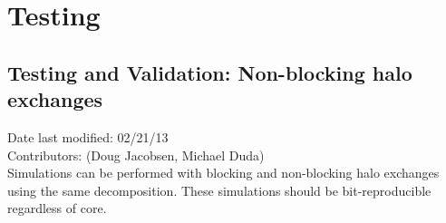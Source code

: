 \documentclass[11pt]{report}
\begin{document}

\chapter{Testing}

\section{Testing and Validation: Non-blocking halo exchanges}
Date last modified: 02/21/13 \\
Contributors: (Doug Jacobsen, Michael Duda) \\

Simulations can be performed with blocking and non-blocking halo exchanges
using the same decomposition. These simulations should be bit-reproducible
regardless of core.

\end{document}
